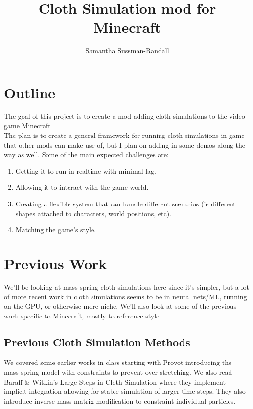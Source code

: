 \documentclass[12pt, twocolumn]{article}
\title{Cloth Simulation mod for Minecraft}
\author{Samantha Sussman-Randall}
\begin{document}
\maketitle

\section{Outline}

The goal of this project is to create a mod adding cloth simulations to the video game Minecraft \cite{mc}\\

The plan is to create a general framework for running cloth simulations in-game that other mods can make use of, but I plan on adding in some demos along the way as well. Some of the main expected challenges are:
\begin{enumerate}
    \item Getting it to run in realtime with minimal lag.
    \item Allowing it to interact with the game world.
    \item Creating a flexible system that can handle different scenarios (ie different shapes attached to characters, world positions, etc).
    \item Matching the game's style.
\end{enumerate}

\section{Previous Work}

We'll be looking at mass-spring cloth simulations here since it's simpler, but a lot of more recent work in cloth simulations seems to be in neural nets/ML, running on the GPU, or otherwise more niche. We'll also look at some of the previous work specific to Minecraft, mostly to reference style.

\subsection{Previous Cloth Simulation Methods}

We covered some earlier works in class starting with Provot \cite{provot} introducing the mass-spring model with constraints to prevent over-stretching. We also read Baraff \& Witkin's Large Steps in Cloth Simulation \cite{largesteps} where they implement implicit integration allowing for stable simulation of larger time steps. They also introduce inverse mass matrix modification to constraint individual particles.\\
\end{document}
